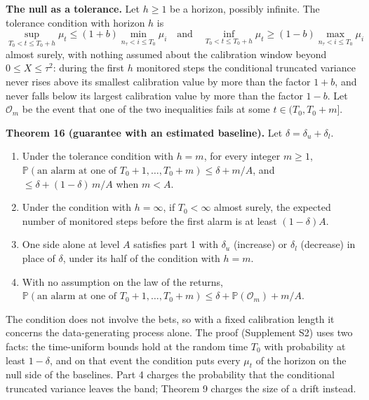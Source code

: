 \documentclass[
]{article}
\providecommand{\tightlist}{%
  \setlength{\itemsep}{0pt}\setlength{\parskip}{0pt}}
\begin{document}
\textbf{The null as a tolerance.} Let \(h \ge 1\) be a horizon, possibly
infinite. The tolerance condition with horizon \(h\) is \[
\sup_{T_0 < t \le T_0 + h} \mu_t \le (1+b) \min_{n_\tau < i \le T_0} \mu_i \quad\text{and}\quad \inf_{T_0 < t \le T_0 + h} \mu_t \ge (1-b) \max_{n_\tau < i \le T_0} \mu_i
\] almost surely, with nothing assumed about the calibration window
beyond \(0 \le X \le \tau^2\): during the first \(h\) monitored steps
the conditional truncated variance never rises above its smallest
calibration value by more than the factor \(1 + b\), and never falls
below its largest calibration value by more than the factor \(1 - b\).
Let \(\mathcal{O}_m\) be the event that one of the two inequalities
fails at some \(t \in (T_0, T_0 + m]\).

\textbf{Theorem 16 (guarantee with an estimated baseline).} Let
\(\delta = \delta_u + \delta_l\).

\begin{enumerate}
\def\labelenumi{\arabic{enumi}.}
\tightlist
\item
  Under the tolerance condition with \(h = m\), for every integer
  \(m \ge 1\),
  \(\mathbb{P}(\text{an alarm at one of } T_0 + 1, \dots, T_0 + m) \le \delta + m/A\),
  and \(\le \delta + (1-\delta)\,m/A\) when \(m < A\).
\item
  Under the condition with \(h = \infty\), if \(T_0 < \infty\) almost
  surely, the expected number of monitored steps before the first alarm
  is at least \((1-\delta)A\).
\item
  One side alone at level \(A\) satisfies part 1 with \(\delta_u\)
  (increase) or \(\delta_l\) (decrease) in place of \(\delta\), under
  its half of the condition with \(h = m\).
\item
  With no assumption on the law of the returns,
  \(\mathbb{P}(\text{an alarm at one of } T_0 + 1, \dots, T_0 + m) \le \delta + \mathbb{P}(\mathcal{O}_m) + m/A\).
\end{enumerate}

The condition does not involve the bets, so with a fixed calibration
length it concerns the data-generating process alone. The proof
(Supplement S2) uses two facts: the time-uniform bounds hold at the
random time \(T_0\) with probability at least \(1 - \delta\), and on
that event the condition puts every \(\mu_t\) of the horizon on the null
side of the baselines. Part 4 charges the probability that the
conditional truncated variance leaves the band; Theorem 9 charges the
size of a drift instead.
\end{document}
